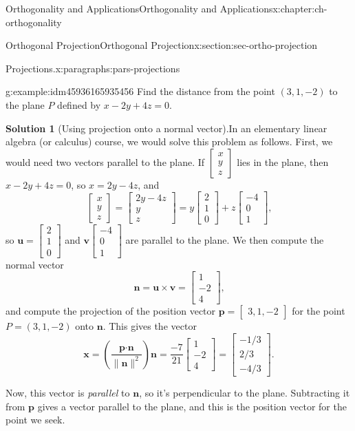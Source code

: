 \documentclass[oneside,10pt,]{book}
\newcommand{\blocktitlefont}{\relax}
\numberwithin{equation}{section}
\newcommand{\bbm}{\begin{bmatrix}}
\newcommand{\ebm}{\end{bmatrix}}
\newcommand{\dotp}{\!\boldsymbol{\cdot}\!}
\newcommand{\len}[1]{\lVert #1\rVert}
\newcommand{\uu}{\mathbf{u}}
\newcommand{\vv}{\mathbf{v}}
\newcommand{\xx}{\mathbf{x}}
\begin{document}
\begin{chapterptx}{Orthogonality and Applications}{}{Orthogonality and Applications}{}{}{x:chapter:ch-orthogonality}
\begin{sectionptx}{Orthogonal Projection}{}{Orthogonal Projection}{}{}{x:section:sec-ortho-projection}
\begin{paragraphs}{Projections.}{x:paragraphs:pars-projections}
{}%
\par
\begin{example}{}{g:example:idm45936165935456}%
Find the distance from the point \((3,1,-2)\) to the plane \(P\) defined by \(x-2y+4z=0\).%
\par\smallskip%
\noindent\textbf{\blocktitlefont Solution 1} (Using projection onto a normal vector).\label{g:solution:idm45936165933440}{}\hypertarget{g:solution:idm45936165933440}{}\quad{}In an elementary linear algebra (or calculus) course, we would solve this problem as follows. First, we would need two vectors parallel to the plane. If \(\bbm x\\y\\z\ebm\) lies in the plane, then \(x-2y+4z=0\), so \(x=2y-4z\), and%
\begin{equation*}
\bbm x\\y\\z\ebm = \bbm 2y-4z\\y\\z\ebm = y\bbm 2\\1\\0\ebm + z\bbm -4\\0\\1\ebm\text{,}
\end{equation*}
so \(\uu=\bbm 2\\1\\0\ebm\) and \(\vv\bbm -4\\0\\1\ebm\) are parallel to the plane. We then compute the normal vector%
\begin{equation*}
\mathbf{n}=\uu\times\vv=\bbm 1\\-2\\4\ebm\text{,}
\end{equation*}
and compute the projection of the position vector \(\mathbf{p}=\bbm 3,1,-2\ebm\) for the point \(P=(3,1,-2)\) onto \(\mathbf{n}\). This gives the vector%
\begin{equation*}
\xx = \left(\frac{\mathbf{p}\dotp\mathbf{n}}{\len{\mathbf{n}}^2}\right)\mathbf{n} = \frac{-7}{21}\bbm 1\\-2\\4\ebm =\bbm-1/3\\2/3\\-4/3\ebm\text{.}
\end{equation*}
%
\par
Now, this vector is \emph{parallel} to \(\mathbf{n}\), so it's perpendicular to the plane. Subtracting it from \(\mathbf{p}\) gives a vector parallel to the plane, and this is the position vector for the point we seek.%

\end{example}
\end{paragraphs}
\end{sectionptx}
\end{chapterptx}
\end{document}
